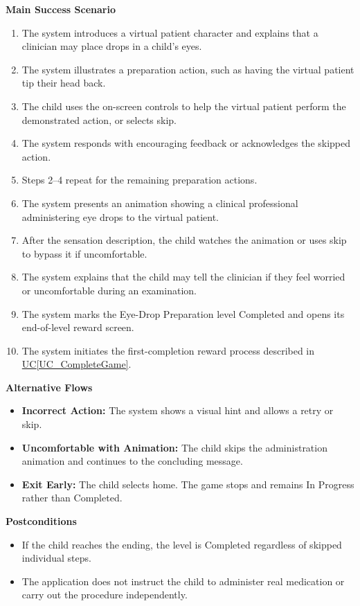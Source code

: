 \documentclass[10pt]{article}
\newcommand{\ucref}[1]{\hyperref[#1]{UC\ref*{#1}}}
\begin{document}
\textbf{Main Success Scenario}
\begin{enumerate}
    \item The system introduces a virtual patient character and
    explains that a clinician may place drops in a child's eyes.
    \item The system illustrates a preparation action, such as having
    the virtual patient tip their head back.
    \item The child uses the on-screen controls to help the virtual
    patient perform the demonstrated action, or selects skip.
    \item The system responds with encouraging feedback or
    acknowledges the skipped action.
    \item Steps 2--4 repeat for the remaining preparation actions.
    \item The system presents an animation showing a clinical
    professional administering eye drops to the virtual patient.
    \item After the sensation description, the child watches the
    animation or uses skip to bypass it if uncomfortable.
    \item The system explains that the child may tell the clinician
    if they feel worried or uncomfortable during an examination.
    \item The system marks the Eye-Drop Preparation level Completed
    and opens its end-of-level reward screen.
    \item The system initiates the first-completion reward process
    described in \ucref{UC_CompleteGame}.
\end{enumerate}

\textbf{Alternative Flows}
\begin{itemize}
    \item \textbf{Incorrect Action:} The system shows a visual hint
    and allows a retry or skip.
    \item \textbf{Uncomfortable with Animation:} The child skips the
    administration animation and continues to the concluding message.
    \item \textbf{Exit Early:} The child selects home. The game
    stops and remains In Progress rather than Completed.
\end{itemize}

\textbf{Postconditions}
\begin{itemize}
    \item If the child reaches the ending, the level is Completed
    regardless of skipped individual steps.
    \item The application does not instruct the child to administer
    real medication or carry out the procedure independently.
\end{itemize}
\end{document}
